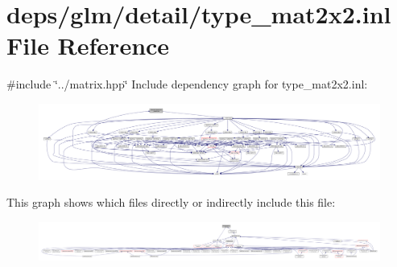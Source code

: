 \hypertarget{type__mat2x2_8inl}{}\section{deps/glm/detail/type\+\_\+mat2x2.inl File Reference}
\label{type__mat2x2_8inl}
{\ttfamily \#include \char`\"{}../matrix.\+hpp\char`\"{}}\newline
Include dependency graph for type\+\_\+mat2x2.\+inl\+:
\nopagebreak
\begin{figure}[H]
\begin{center}
\leavevmode
\includegraphics[width=350pt]{df/d6f/type__mat2x2_8inl__incl}
\end{center}
\end{figure}
This graph shows which files directly or indirectly include this file\+:
\nopagebreak
\begin{figure}[H]
\begin{center}
\leavevmode
\includegraphics[width=350pt]{d6/daf/type__mat2x2_8inl__dep__incl}
\end{center}
\end{figure}
